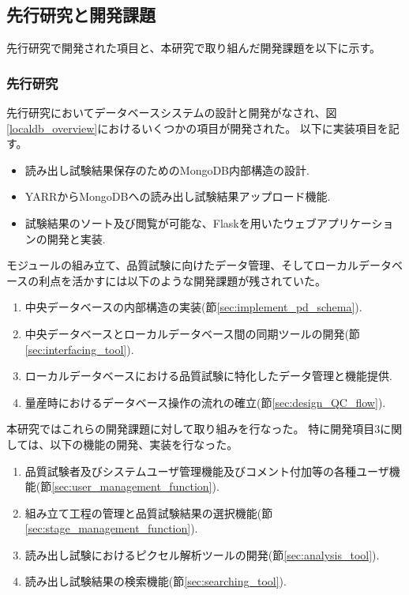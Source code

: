 \subsection{先行研究と開発課題}
先行研究で開発された項目と、本研究で取り組んだ開発課題を以下に示す。

\subsubsection{先行研究}
先行研究\cite{4-6}においてデータベースシステムの設計と開発がなされ、図\ref{localdb_overview}におけるいくつかの項目が開発された。
以下に実装項目を記す。
\begin{itemize}
  \item 読み出し試験結果保存のためのMongoDB内部構造の設計.
  \item YARRからMongoDBへの読み出し試験結果アップロード機能.
  \item 試験結果のソート及び閲覧が可能な、Flaskを用いたウェブアプリケーションの開発と実装. 
\end{itemize}

モジュールの組み立て、品質試験に向けたデータ管理、そしてローカルデータベースの利点を活かすには以下のような開発課題が残されていた。
\begin{enumerate}
  \item 中央データベースの内部構造の実装(節\ref{sec:implement_pd_schema}).
  \item 中央データベースとローカルデータベース間の同期ツールの開発(節\ref{sec:interfacing_tool}).
  \item ローカルデータベースにおける品質試験に特化したデータ管理と機能提供.
  \item 量産時におけるデータベース操作の流れの確立(節\ref{sec:design_QC_flow}).
\end{enumerate}

本研究ではこれらの開発課題に対して取り組みを行なった。
特に開発項目3に関しては、以下の機能の開発、実装を行なった。
\begin{enumerate}
  \renewcommand{\labelenumi}{(\roman{enumi})} 
  \item 品質試験者及びシステムユーザ管理機能及びコメント付加等の各種ユーザ機能(節\ref{sec:user_management_function}).
  \item 組み立て工程の管理と品質試験結果の選択機能(節\ref{sec:stage_management_function}).
  \item 読み出し試験におけるピクセル解析ツールの開発(節\ref{sec:analysis_tool}).
  \item 読み出し試験結果の検索機能(節\ref{sec:searching_tool}).
\end{enumerate}

